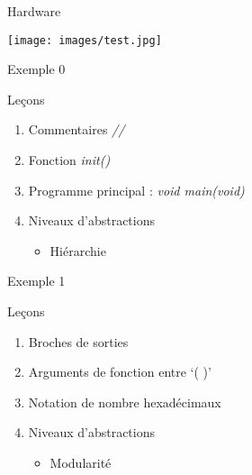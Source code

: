 \begin{frame}{Hardware}

\begin{center}
\texttt{[image: images/test.jpg]}
\end{center}

\end{frame}

\begin{frame}{Exemple 0}



\end{frame}

\begin{frame}{Leçons}

\begin{enumerate}
\def\labelenumi{\arabic{enumi}.}
\itemsep1pt\parskip0pt
\item
  Commentaires \emph{//}
\item
  Fonction \emph{init()}
\item
  Programme principal : \emph{void main(void)}
\item
  Niveaux d'abstractions

  \begin{itemize}
  \itemsep1pt\parskip0pt
  \item
    Hiérarchie
  \end{itemize}
\end{enumerate}

\end{frame}

\begin{frame}{Exemple 1}



\end{frame}

\begin{frame}{Leçons}

\begin{enumerate}
\def\labelenumi{\arabic{enumi}.}
\itemsep1pt\parskip0pt
\item
  Broches de sorties
\item
  Arguments de fonction entre `( )'
\item
  Notation de nombre hexadécimaux
\item
  Niveaux d'abstractions

  \begin{itemize}
  \itemsep1pt\parskip0pt
  \item
    Modularité
  \end{itemize}
\end{enumerate}

\end{frame}

